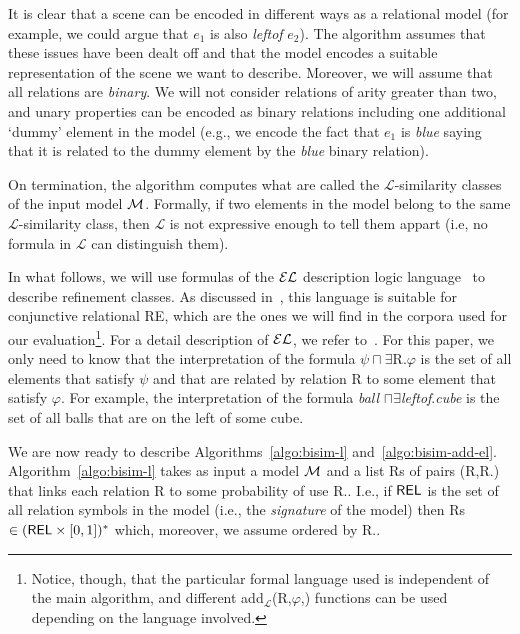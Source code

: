 It is clear that a scene can be encoded in different ways as a relational model (for example, we could argue that $e_1$ is also \emph{leftof} $e_2$).  The algorithm assumes that these issues have been dealt off and that the model encodes a suitable representation of the scene we want to describe.  Moreover, we will assume that all relations are \emph{binary}.  We will not consider relations of arity greater than two, and unary
properties can be encoded as binary relations including one additional `dummy' element in the model (e.g., we encode the fact that $e_1$ is \emph{blue} saying that it is related to the dummy element by the \emph{blue} binary relation).

On termination, the algorithm computes what are called the $\mathcal{L}$-similarity classes of the input model $\mathcal{M}$. Formally, if two elements in the model belong to the same $\mathcal{L}$-similarity class, then $\mathcal{L}$ is not expressive enough to tell them appart (i.e, no formula in $\mathcal{L}$ can distinguish them). 

In what follows, we will use formulas of the $\mathcal{EL}$ description logic language~\cite{baad:desc03} to describe refinement classes.  As discussed in~\cite{arec2:2008:Areces}, this language is suitable for conjunctive relational RE, which are the ones we will find in the corpora used for our evaluation\footnote{Notice, though, that the particular formal language used is independent of the main algorithm, and different add$_{\mathcal{L}}$(R,$\varphi$,\RE) functions can be used depending on the language involved.}. For a detail description of $\mathcal{EL}$, we refer to~\cite{baad:desc03}.  For this paper, we only need to know that the interpretation of the formula $\psi \sqcap \exists$R.$\varphi$ is the set of all elements that satisfy $\psi$ and that are related by relation R to some element that satisfy $\varphi$. For example, the interpretation of the formula \emph{ball} $\sqcap \exists$\emph{leftof}.\emph{cube} is the set of all balls that are on the left of some cube.  

We are now ready to describe Algorithms~\ref{algo:bisim-l} and~\ref{algo:bisim-add-el}. Algorithm~\ref{algo:bisim-l} takes as input a model $\mathcal{M}$ and a list Rs of pairs (R,R.\puse) that links each relation R to some probability of use R.\puse. I.e., if $\textsf{REL}$ is the set of all relation symbols in the model (i.e., the \emph{signature} of the model) then Rs $\in (\textsf{REL} \times [0,1])^*$ which, moreover, we assume ordered by R.\puse. 

